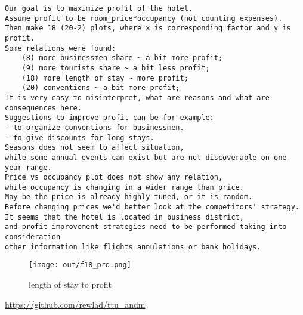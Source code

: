 \documentclass{article}
\begin{document}
\begin{verbatim}
Our goal is to maximize profit of the hotel.
Assume profit to be room_price*occupancy (not counting expenses).
Then make 18 (20-2) plots, where x is corresponding factor and y is profit.
Some relations were found:
    (8) more businessmen share ~ a bit more profit;
    (9) more tourists share ~ a bit less profit;
    (18) more length of stay ~ more profit;
    (20) conventions ~ a bit more profit;
It is very easy to misinterpret, what are reasons and what are consequences here.
Suggestions to improve profit can be for example:
- to organize conventions for businessmen.
- to give discounts for long-stays.
Seasons does not seem to affect situation, 
while some annual events can exist but are not discoverable on one-year range.
Price vs occupancy plot does not show any relation,
while occupancy is changing in a wider range than price.
May be the price is already highly tuned, or it is random.
Before changing prices we'd better look at the competitors' strategy.
It seems that the hotel is located in business district,
and profit-improvement-strategies need to be performed taking into consideration 
other information like flights annulations or bank holidays.
\end{verbatim}

\begin{figure}[h!]
\centering
\texttt{[image: out/f18\_pro.png]}
\caption{length of stay to profit}
\end{figure}

\clearpage



\url{https://github.com/rewlad/ttu_andm}
\end{document}

